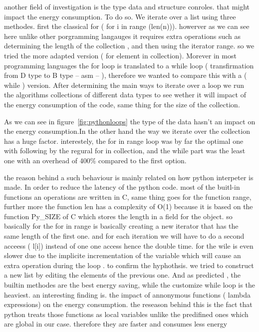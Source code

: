 


another field of investigation is the type data and structure conroles. that might impact the energy consumption.
To do so. We iterate over a list using three methodes.
first the classical for ( for i in range (len(n))). howerver as we can see here unlike other porgramming langauges it requires extra operations such as determining the length of the collection , and then using the iterator range. so we tried the more adapted version
( for element in collection). Morever in most programming languages the for loop is translated to a while loop ( transfirmation from D type to B type -- asm -- ), therefore we wanted to compare this with a ( while ) version.
After determining the main ways to iterate over a loop we run the algorithms  collections of different data types to see wether it will impact of the energy consumption of the code, same thing for the size of the collection.

As we can see in figure~\ref{fig:pythonloops} the type of the data hasn't an impact on the energy consumption.In the other hand the way we iterate over the collection has a huge factor. interestely, the for in range loop was by far the optimal one with following by the regural for in collection, and the while part was the least one with an overhead of 400\% compared to the first option.



the reason behind a such behaviour is mainly related on how python interpeter is made.
In order to reduce the latency of the python code. most of the buitl-in functions an operations are written in C, same thing goes for the function range, further more the function len has a complexity of O(1) because it is based on the function Py\_SIZE  of C which stores the length in a field for the object.
so basically for the for in range is basically creating a new iterator that has the same length of the first one. and for each iteration we will have to do a second acceess ( l[i]) instead of one one access hence the double time.
for the wile is even slower due to the implicite incrementation of the variable which will cause an extra operation during the loop .
to confirm the hyphothsis. we tried to construct a new list by editing the elements of the previous one. And as predicted , the builtin methodes are the best energy saving, while the customize while loop is the heaviest. an interesting finding is. the impact of annonymous functions ( lambda expressions) on the energy consumption.
the reseason behind this is the fact that python treats those functions as local variables unlike the predifined ones which are global in our case. therefore they are faster and consumes less energy  %

